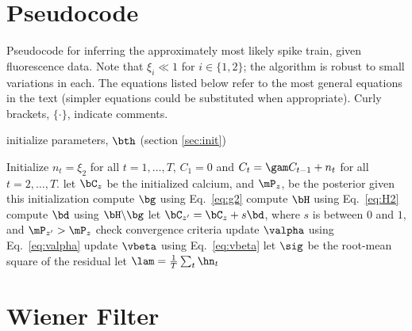 \section{Pseudocode} \label{sec:pseudo}

\begin{algorithm}[h!]
\caption{Pseudocode for inferring the approximately most likely spike train, given fluorescence data. Note that $\xi_i \ll 1$ for $i \in \{1,2\}$; the algorithm is robust to small variations in each. The equations listed below refer to the most general equations in the text (simpler equations could be substituted when appropriate).  Curly brackets, $\{ \cdot \}$, indicate comments.}
\label{eqn:pseudocode}
\begin{algorithmic}[1]
\STATE initialize parameters, $\bth$ (section \ref{sec:init})
	
    \STATE Initialize $n_t=\xi_2$ for all $t=1,\ldots, T$, $C_1=0$ and $C_t = \gam C_{t-1} + n_t$ for all $t=2,\ldots, T$.
	\STATE let $\bC_{z}$ be the initialized calcium, and $\mP_{z}$, be the posterior given this initialization
		\STATE compute $\bg$ using Eq.~\eqref{eq:g2}
		\STATE compute $\bH$ using Eq.~\eqref{eq:H2}
		\STATE compute $\bd$ using $\bH \backslash \bg$ 
		\STATE let $\bC_{z'}=\bC_z + s \bd$, where $s$ is between $0$ and $1$, and $\mP_{z'}>\mP_z$ 
	\ENDWHILE
  \ENDFOR
\STATE check convergence criteria
\STATE update $\valpha$ using Eq.~\eqref{eq:valpha}   
\STATE update $\vbeta$ using Eq.~\eqref{eq:vbeta}
\STATE let $\sig$ be the root-mean square of the residual
\STATE let $\lam=\frac{1}{T}\sum_t \hn_t$
\ENDWHILE
\end{algorithmic}
\end{algorithm}

\section{Wiener Filter} \label{sec:wiener}

